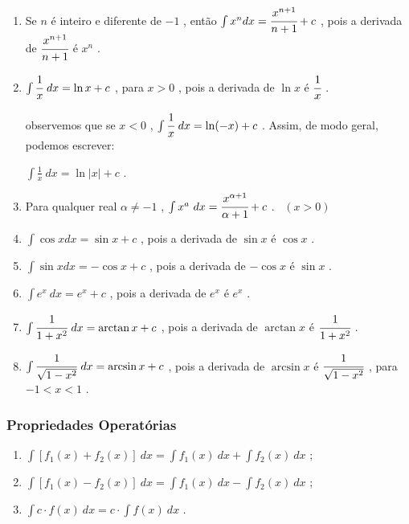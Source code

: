 			\begin{enumerate}[label=(\alph*)]

				\item Se $ n $ é inteiro e diferente de $ -1 $ , então {\LARGE $\int x^{n} dx = \cfrac {x^{n + 1}} {n+1} + c $} , pois a derivada de $ \cfrac {x^{n + 1}} {n+1} $ é $ x^{n} $ .

				\item $\int \cfrac {1} {x} \ dx = \ln x + c $ , para $ x > 0 $ , pois a derivada de $ \ln x $ é $ \cfrac {1} {x} $ .
			
				observemos que se $ x < 0 $ , $ \int \cfrac {1} {x} \ dx = \ln (-x) + c $ . Assim, de modo geral, podemos escrever:

				\bigskip

				{\LARGE $\int \frac {1} {x} \ dx = \ln |x| + c$} .

				\item Para qualquer real $\alpha \neq -1$ , {\Large $\int x^{a} \ dx = \cfrac {x^{\alpha + 1}} {\alpha + 1} + c$} . \ $(x > 0)$
			
				\item {\LARGE $\int \cos xdx = \sin x + c$} , pois a derivada de $ \sin x $ é $ \cos x $ .

				\item {\LARGE $\int \sin xdx = - \cos x + c$} , pois a derivada de $- \cos x$ é $\sin x$ .

				\item {\LARGE $\int e^{x} \ dx = e^{x} + c$} , pois a derivada de $e^{x} $ é $e^{x}$ .

				\item {\LARGE $\int \cfrac {1}{1+x^{2}} \ dx = \arctan x + c$} , pois a derivada de $\arctan x$ é $\cfrac {1}{1+x^{2}}$ .

				\item {\LARGE $\int \cfrac {1}{\sqrt{1 - x^{2}}} \ dx = \arcsin x + c$} , pois a derivada de $\arcsin x$ é $\cfrac {1}{\sqrt{1 - x^{2}}} $ , para $ -1 < x < 1$ .
				
			\end{enumerate}
	
		\subsubsection{Propriedades Operatórias \cite{morettin}}
	
			\begin{enumerate}[label=(P\arabic*)]
			
				\item {\LARGE $\int [ f_{1} (x) + f_{2} (x) ] \ dx = \int f_{1} (x) \ dx + \int f_{2} (x) \ dx$} ;
			
				\item {\LARGE $\int [ f_{1} (x) - f_{2} (x) ] \ dx = \int f_{1} (x) \ dx - \int f_{2} (x) \ dx$} ;
			
				\item {\LARGE $\int c \cdot f(x) \ dx = c \cdot \int f(x) \ dx$} .
		
			\end{enumerate}
	
